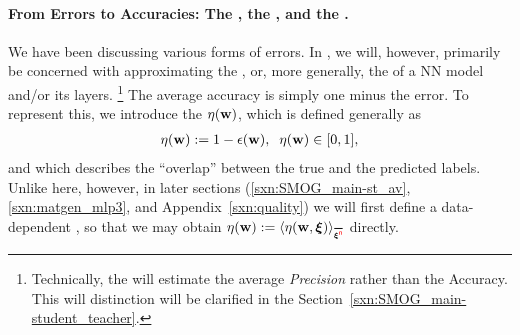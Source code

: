 \paragraph{From Errors to Accuracies: The \AverageGeneralizationAccuracy, the \Quality, and the \SelfOverlap.}
We have been discussing various forms of errors.
In \SETOL, we will, however, primarily be concerned with approximating the \emph{\AverageGeneralizationAccuracy},
or, more generally, the \Quality of a NN model and/or its layers.
\footnote{Technically, the \Quality will estimate the average \emph{Precision} rather than the Accuracy.
This will distinction will be clarified in the Section~\ref{sxn:SMOG_main-student_teacher}.}
The average accuracy is simply one minus the error.
To represent this,
we introduce the \emph{\SelfOverlap} $\eta({\mathbf{w}})$, which is defined generally as
\begin{align}
 \label{eqn:def_eta}
 \eta({\mathbf{w}}) := 1 -\epsilon({\mathbf{w}}) ,\;\;\eta({\mathbf{w}})\in[0,1] ,
\end{align}
and which 
describes the ``overlap'' between the true and the predicted labels.
Unlike here, however, in later sections
(\ref{sxn:SMOG_main-st_av}, \ref{sxn:matgen_mlp3}, and Appendix~\ref{sxn:quality})
we will first define a data-dependent \SelfOverlap, so that we may obtain
 $\ETA(\WVEC):=\langle\ETA(\WVEC,\XI)\rangle_{\AVGNDXIn}$ directly.


